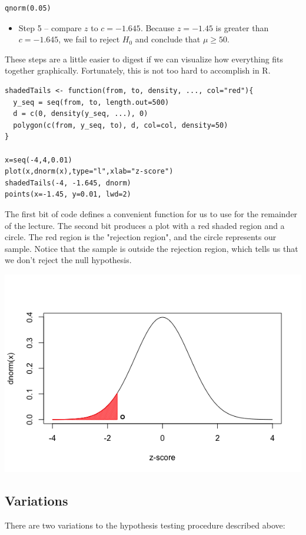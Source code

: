 \documentclass[11pt]{article}
\begin{document}
\begin{verbatim}
qnorm(0.05)
\end{verbatim}

\begin{itemize}
\item Step 5 -- compare $z$ to $c=-1.645$.  Because $z=-1.45$ is greater than $c=-1.645$, we fail to reject $H_0$ and conclude that $\mu \geq 50$.
\end{itemize}

These steps are a little easier to digest if we can visualize how everything fits together graphically.  Fortunately, this is not too hard to accomplish in R.

\begin{verbatim}
shadedTails <- function(from, to, density, ..., col="red"){
  y_seq = seq(from, to, length.out=500)
  d = c(0, density(y_seq, ...), 0)
  polygon(c(from, y_seq, to), d, col=col, density=50)
}
  
x=seq(-4,4,0.01)
plot(x,dnorm(x),type="l",xlab="z-score")
shadedTails(-4, -1.645, dnorm)
points(x=-1.45, y=0.01, lwd=2)
\end{verbatim}

The first bit of code defines a convenient function for us to use for the remainder of the lecture.  The second bit produces a plot with a red shaded region and a circle.  The red region is the "rejection region", and the circle represents our sample.  Notice that the sample is outside the rejection region, which tells us that we don't reject the null hypothesis.

\includegraphics[width=.9\linewidth]{figures/week4/rejectionRegion.png}

\subsection*{Variations}
\label{sec-1-3}
There are two variations to the hypothesis testing procedure described above:
\end{document}
